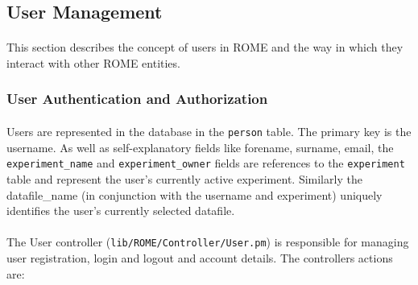 \subsection{User Management}

\paragraph{}
This section describes the concept of users in ROME and the way in which they interact with other ROME entities.

% 
% 
% 

\subsubsection{User Authentication and Authorization}

\paragraph{}
Users are represented in the database in the \texttt{person} table. The primary key is the username. As well as self-explanatory fields like forename, surname, email, the \texttt{experiment\_name} and \texttt{experiment\_owner} fields are references to the \texttt{experiment} table and represent the user's currently active experiment. Similarly the datafile\_name (in conjunction with the username and experiment) uniquely identifies the user's currently selected datafile.

\paragraph{}
The User controller (\texttt{lib/ROME/Controller/User.pm}) is responsible for managing user registration, login and logout and account details. The controllers actions are:

